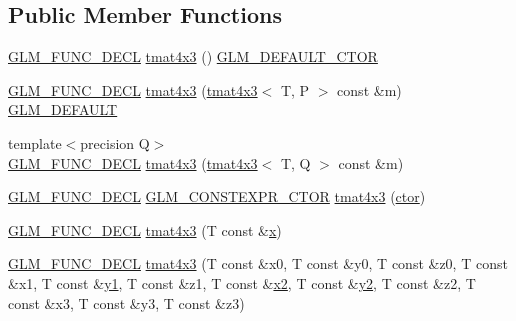 \subsection*{Public Member Functions}
\begin{DoxyCompactItemize}
\item 
\mbox{\hyperlink{setup_8hpp_ab2d052de21a70539923e9bcbf6e83a51}{G\+L\+M\+\_\+\+F\+U\+N\+C\+\_\+\+D\+E\+CL}} \mbox{\hyperlink{structglm_1_1tmat4x3_aca9d4b06f9ccb23df420cefd945e3374}{tmat4x3}} () \mbox{\hyperlink{setup_8hpp_afb97a4e995bc004c0cbbfa22125b80ba}{G\+L\+M\+\_\+\+D\+E\+F\+A\+U\+L\+T\+\_\+\+C\+T\+OR}}
\item 
\mbox{\hyperlink{setup_8hpp_ab2d052de21a70539923e9bcbf6e83a51}{G\+L\+M\+\_\+\+F\+U\+N\+C\+\_\+\+D\+E\+CL}} \mbox{\hyperlink{structglm_1_1tmat4x3_a5741733ec73d12a93fd1088965fb0523}{tmat4x3}} (\mbox{\hyperlink{structglm_1_1tmat4x3}{tmat4x3}}$<$ T, P $>$ const \&m) \mbox{\hyperlink{setup_8hpp_aefce7051c376a64ba89fa93a9f63bc2c}{G\+L\+M\+\_\+\+D\+E\+F\+A\+U\+LT}}
\item 
{\footnotesize template$<$precision Q$>$ }\\\mbox{\hyperlink{setup_8hpp_ab2d052de21a70539923e9bcbf6e83a51}{G\+L\+M\+\_\+\+F\+U\+N\+C\+\_\+\+D\+E\+CL}} \mbox{\hyperlink{structglm_1_1tmat4x3_a1dadd893a6f4303c828c1703c01b6a82}{tmat4x3}} (\mbox{\hyperlink{structglm_1_1tmat4x3}{tmat4x3}}$<$ T, Q $>$ const \&m)
\item 
\mbox{\hyperlink{setup_8hpp_ab2d052de21a70539923e9bcbf6e83a51}{G\+L\+M\+\_\+\+F\+U\+N\+C\+\_\+\+D\+E\+CL}} \mbox{\hyperlink{setup_8hpp_ad34178a09666081abdb573c14d1f4a5a}{G\+L\+M\+\_\+\+C\+O\+N\+S\+T\+E\+X\+P\+R\+\_\+\+C\+T\+OR}} \mbox{\hyperlink{structglm_1_1tmat4x3_a8311c825e665728b311c89b517672965}{tmat4x3}} (\mbox{\hyperlink{namespaceglm_a807df837905ec286f806a536af03b57f}{ctor}})
\item 
\mbox{\hyperlink{setup_8hpp_ab2d052de21a70539923e9bcbf6e83a51}{G\+L\+M\+\_\+\+F\+U\+N\+C\+\_\+\+D\+E\+CL}} \mbox{\hyperlink{structglm_1_1tmat4x3_ac334fddfc2ee55301365a3dba5919e06}{tmat4x3}} (T const \&\mbox{\hyperlink{glad_8h_a92d0386e5c19fb81ea88c9f99644ab1d}{x}})
\item 
\mbox{\hyperlink{setup_8hpp_ab2d052de21a70539923e9bcbf6e83a51}{G\+L\+M\+\_\+\+F\+U\+N\+C\+\_\+\+D\+E\+CL}} \mbox{\hyperlink{structglm_1_1tmat4x3_ac85a3693a2bef96d65be77e76c70acdb}{tmat4x3}} (T const \&x0, T const \&y0, T const \&z0, T const \&x1, T const \&\mbox{\hyperlink{glad_8h_a48340161068d267815ac3131e9d03def}{y1}}, T const \&z1, T const \&\mbox{\hyperlink{glad_8h_ad2cea6eadb01f017f0d57e7edf0ce988}{x2}}, T const \&\mbox{\hyperlink{glad_8h_af7158b5d27f7a6aa4ab9973fcc3a5c20}{y2}}, T const \&z2, T const \&x3, T const \&y3, T const \&z3)

\end{DoxyCompactItemize}
